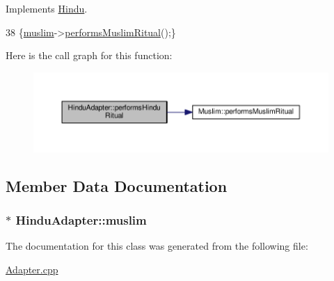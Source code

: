 Implements \hyperlink{classHindu_aff8995fbde7a7c14940ed2fe2bf7b14c}{Hindu}.


\begin{DoxyCode}
38 \{\hyperlink{classHinduAdapter_a7447c22b644955b0ba076271ad4cb739}{muslim}->\hyperlink{classMuslim_af6792dc11aa3e0f86818af0c0ba4da11}{performsMuslimRitual}();\}
\end{DoxyCode}


Here is the call graph for this function\+:
\nopagebreak
\begin{figure}[H]
\begin{center}
\leavevmode
\includegraphics[width=350pt]{classHinduAdapter_a92390edb029c059347c8e3bdb825c5ce_cgraph}
\end{center}
\end{figure}




\subsection{Member Data Documentation}
\subsubsection[{\texorpdfstring{muslim}{muslim}}]{$\ast$ Hindu\+Adapter\+::muslim\hspace{0.3cm}{\ttfamily [private]}}\hypertarget{classHinduAdapter_a7447c22b644955b0ba076271ad4cb739}{}\label{classHinduAdapter_a7447c22b644955b0ba076271ad4cb739}


The documentation for this class was generated from the following file\+:\begin{DoxyCompactItemize}
\item 
\hyperlink{Adapter_8cpp}{Adapter.\+cpp}\end{DoxyCompactItemize}
